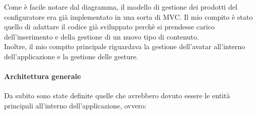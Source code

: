 Come \`e facile notare dal diagramma, il modello di gestione dei prodotti del configuratore era gi\`a implementato in una sorta di MVC. Il mio compito \`e stato quello di adattare il codice gi\`a sviluppato perch\`e si prendesse carico dell'inserimento e della gestione di un nuovo tipo di contenuto. \\
Inoltre, il mio compito principale riguardava la gestione dell'avatar all'interno dell'applicazione e la gestione delle gesture.

\paragraph{Architettura generale}
Da subito sono state definite quelle che avrebbero dovuto essere le entit\`a principali all'interno dell'applicazione, ovvero:

